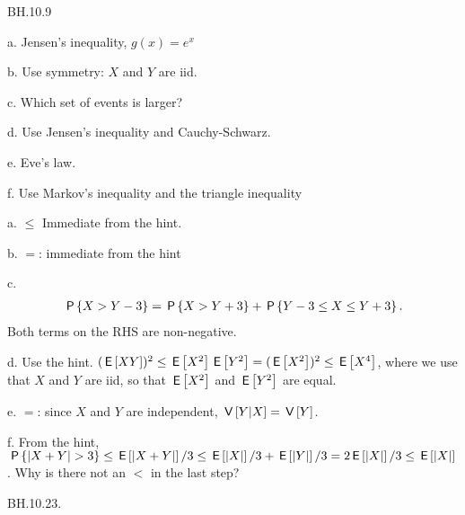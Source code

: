 \begin{exercise}
BH.10.9
\begin{hint}
a. Jensen's inequality, $g(x)=e^x$

b. Use symmetry: $X$ and $Y$ are iid.

c. Which set of events is larger?

d.
Use Jensen's inequality and Cauchy-Schwarz.

e. Eve's law.

f. Use Markov's inequality and  the triangle inequality
\end{hint}
\begin{solution}
a. $\leq$ Immediate from the hint.

b. $=$: immediate from the hint

c.
\begin{align*}
\P{X>Y-3} =  \P{X>Y+3} + \P{Y-3\leq X \leq Y+3}.
\end{align*}
Both terms on the RHS are non-negative.

d. Use the hint. $(\E{XY})^{2} \leq \E{X^2}\E{Y^2} =(\E{X^2})^{2} \leq \E{X^4}$, where we use that  $X$ and $Y$ are iid, so that $\E{X^2}$ and $\E{Y^2}$ are equal.

e. $=$: since $X$ and $Y$ are independent, $\V{Y|X} = \V Y$.

f. From the hint,  $\P{|X+Y|>3} \leq \E{|X+Y|}/3 \leq \E{|X|}/3 + \E{|Y|}/3 = 2\E{|X|}/3 \leq \E{|X|}$. Why is there not an $<$ in the last step?
\end{solution}
\end{exercise}

\begin{exercise}
BH.10.23.
\end{exercise}

